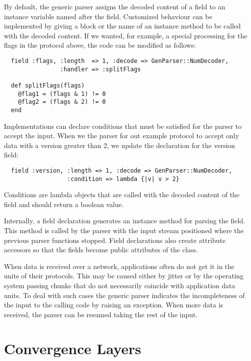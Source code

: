 \documentclass{article}
\begin{document}
By default, the generic parser assigns the decoded content of a field to an
instance variable named after the field. Customized behaviour can be implemented
by giving a block or the name of an instance method to be called with the
decoded content. If we wanted, for example, a special processing for the flags
in the protocol above, the code can be modified as follows:

\begin{verbatim}
  field :flags, :length  => 1, :decode => GenParser::NumDecoder,
                :handler => :splitFlags
  
  def splitFlags(flags)
    @flag1 = (flags & 1) != 0
    @flag2 = (flags & 2) != 0
  end
\end{verbatim}

Implementations can declare conditions that must be satisfied for the parser to
accept the input. When we the parser for out example protocol to accept only
data with a version greater than 2, we update the declaration for the version
field:

\begin{verbatim}
  field :version, :length => 1, :decode => GenParser::NumDecoder,
                  :condition => lambda {|v| v > 2}
\end{verbatim}

Conditions are lambda objects that are called with the decoded content of the
field and should return a boolean value.

Internally, a field declaration generates an instance method for parsing the
field. This method is called by the parser with the input stream positioned
where the previous parser functions stopped. Field declarations also create
attribute accessors so that the fields become public attributes of the class.

When data is received over a network, applications often do not get it in the
units of their protocols. This may be caused either by jitter or by the
operating system passing chunks that do not necessarily coincide with
application data units. To deal with such cases the generic parser indicates the
incompleteness of the input to the calling code by raising an exception. When
more data is received, the parser can be resumed taking the rest of the input.

\section{Convergence Layers}\label{sec.cl}
\end{document}
